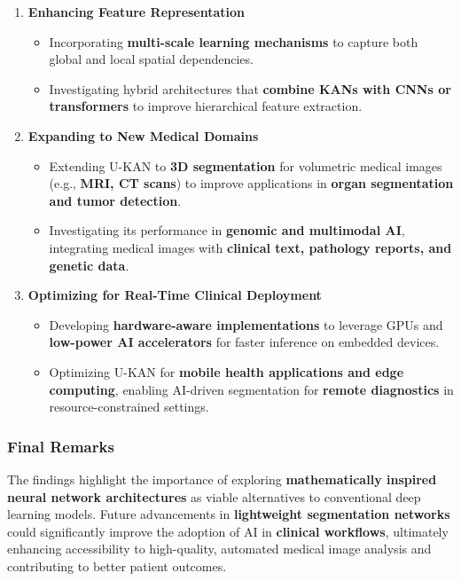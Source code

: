 \documentclass[conference]{IEEEtran}
\begin{document}
\begin{enumerate}
    \item \textbf{Enhancing Feature Representation}
          \begin{itemize}
              \item Incorporating \textbf{multi-scale learning mechanisms} to capture both global
                    and local spatial dependencies.
              \item Investigating hybrid architectures that \textbf{combine KANs with CNNs or
                        transformers} to improve hierarchical feature extraction.
          \end{itemize}

    \item \textbf{Expanding to New Medical Domains}
          \begin{itemize}
              \item Extending U-KAN to \textbf{3D segmentation} for volumetric medical images
                    (e.g., \textbf{MRI, CT scans}) to improve applications in \textbf{organ
                        segmentation and tumor detection}.
              \item Investigating its performance in \textbf{genomic and multimodal AI},
                    integrating medical images with \textbf{clinical text, pathology reports, and
                        genetic data}.
          \end{itemize}

    \item \textbf{Optimizing for Real-Time Clinical Deployment}
          \begin{itemize}
              \item Developing \textbf{hardware-aware implementations} to leverage GPUs and
                    \textbf{low-power AI accelerators} for faster inference on embedded devices.
              \item Optimizing U-KAN for \textbf{mobile health applications and edge computing},
                    enabling AI-driven segmentation for \textbf{remote diagnostics} in
                    resource-constrained settings.
          \end{itemize}
\end{enumerate}

\subsubsection{Final Remarks}
The findings highlight the importance of exploring \textbf{mathematically
    inspired neural network architectures} as viable alternatives to conventional
deep learning models. Future advancements in \textbf{lightweight segmentation
    networks} could significantly improve the adoption of AI in \textbf{clinical
    workflows}, ultimately enhancing accessibility to high-quality, automated
medical image analysis and contributing to better patient outcomes.
\end{document}
